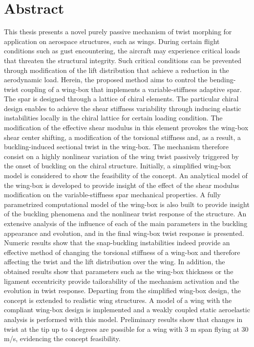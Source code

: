\section*{Abstract}

This thesis presents a novel purely passive mechanism of twist morphing for application on aerospace structures, such as wings. During certain flight conditions such as gust encountering, the aircraft may experience critical loads that threaten the structural integrity. Such critical conditions can be prevented through modification of the lift distribution that achieve a reduction in the aerodynamic load. Herein, the proposed method aims to control the bending-twist coupling of a wing-box that implements a variable-stiffness adaptive spar. The spar is designed through a lattice of chiral elements. The particular chiral design enables to achieve the shear stiffness variability through inducing elastic instabilities locally in the chiral lattice for certain loading condition. The modification of the effective shear modulus in this element provokes the wing-box shear center shifting, a modification of the torsional stiffness and, as a result, a buckling-induced sectional twist in the wing-box. The mechanism therefore consist on a highly nonlinear variation of the wing twist passively triggered by the onset of buckling on the chiral structure. Initially, a simplified wing-box model is considered to show the feasibility of the concept. An analytical model of the wing-box is developed to provide insight of the effect of the shear modulus modification on the variable-stiffness spar mechanical properties. A fully parametrized computational model of the wing-box is also built to provide insight of the buckling phenomena and the nonlinear twist response of the structure. An extensive analysis of the influence of each of the main parameters in the buckling appearance and evolution, and in the final wing-box twist response is presented. Numeric results show that the snap-buckling instabilities indeed provide an effective method of changing the torsional stiffness of a wing-box and therefore affecting the twist and the lift distribution over the wing. In addition, the obtained results show that parameters such as the wing-box thickness or the ligament eccentricity provide tailorability of the mechanism activation and the evolution in twist response. Departing from the simplified wing-box design, the concept is extended to realistic wing structures. A model of a wing with the compliant wing-box design is implemented and a weakly coupled static aeroelastic analysis is performed with this model. Preliminary results show that changes in twist at the tip up to 4 degrees are possible for a wing with 3 m span flying at 30 m/s, evidencing the concept feasibility.

